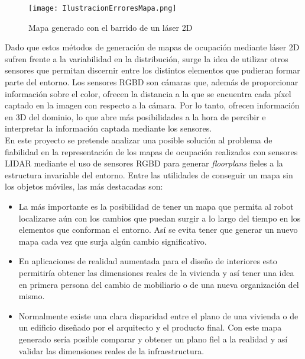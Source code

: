 \begin{figure}[h]
	\begin{center} 
	\texttt{[image: IlustracionErroresMapa.png]}
	\end{center}
	\caption{Mapa generado con el barrido de un láser 2D}
	\label{fig:errores_laser}
\end{figure}

Dado que estos métodos de generación de mapas de ocupación mediante láser 2D sufren frente a la variabilidad en la distribución, surge la idea de utilizar otros sensores que permitan discernir entre los distintos elementos que pudieran formar parte del entorno. Los sensores RGBD son cámaras que, además de proporcionar información sobre el color, ofrecen la distancia a la que se encuentra cada píxel captado en la imagen con respecto a la cámara. Por lo tanto, ofrecen información en 3D del dominio, lo que abre más posibilidades a la hora de percibir e interpretar la información captada mediante los sensores.\\

En este proyecto se pretende analizar una posible solución al problema de fiabilidad en la representación de los mapas de ocupación realizados con sensores LIDAR mediante el uso de sensores RGBD para generar \textit{floorplans} fieles a la estructura invariable del entorno. Entre las utilidades de conseguir un mapa sin los objetos móviles, las más destacadas son:

\begin{itemize}

	\item La más importante es la posibilidad de tener un mapa que permita al robot localizarse aún con los cambios que puedan surgir a lo largo del tiempo en los elementos que conforman el entorno. Así se evita tener que generar un nuevo mapa cada vez que surja algún cambio significativo.
	\item En aplicaciones de realidad aumentada para el diseño de interiores esto permitiría obtener las dimensiones reales de la vivienda y así tener una idea en primera persona del cambio de mobiliario o de una nueva organización del mismo.
	\item Normalmente existe una clara disparidad entre el plano de una vivienda o de un edificio diseñado por el arquitecto y el producto final. Con este mapa generado sería posible comparar y obtener un plano fiel a la realidad y así validar las dimensiones reales de la infraestructura.

\end{itemize}




